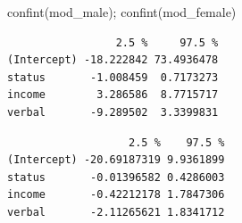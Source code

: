 \documentclass[
  letterpaper,
  DIV=11,
  numbers=noendperiod]{scrartcl}
\newenvironment{Shaded}{\begin{snugshade}}{\end{snugshade}}
\newcommand{\FunctionTok}[1]{\textcolor[rgb]{0.28,0.35,0.67}{#1}}
\newcommand{\NormalTok}[1]{\textcolor[rgb]{0.00,0.23,0.31}{#1}}
\begin{document}
\begin{Shaded}
\begin{Highlighting}[]
\FunctionTok{confint}\NormalTok{(mod\_male); }\FunctionTok{confint}\NormalTok{(mod\_female) }
\end{Highlighting}
\end{Shaded}

\begin{verbatim}
                 2.5 %     97.5 %
(Intercept) -18.222842 73.4936478
status       -1.008459  0.7173273
income        3.286586  8.7715717
verbal       -9.289502  3.3399831
\end{verbatim}

\begin{verbatim}
                   2.5 %    97.5 %
(Intercept) -20.69187319 9.9361899
status       -0.01396582 0.4286003
income       -0.42212178 1.7847306
verbal       -2.11265621 1.8341712
\end{verbatim}
\end{document}
